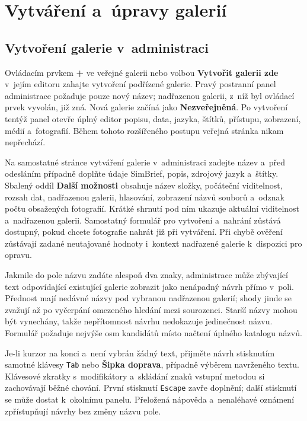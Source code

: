 \documentclass[11pt,a4paper]{article}
\newcommand{\ui}[1]{\textbf{#1}}
\newcommand{\codeword}[1]{\nolinkurl{#1}}
\begin{document}
\section{Vytváření a~úpravy galerií}
\label{sec:create-edit-gallery}

\subsection{Vytvoření galerie v~administraci}

Ovládacím prvkem \ui{+} ve veřejné galerii nebo volbou \ui{Vytvořit galerii zde}
v~jejím editoru zahajte vytvoření podřízené galerie. Pravý postranní panel
administrace požaduje pouze nový název; nadřazenou galerii, z~níž byl ovládací
prvek vyvolán, již zná. Nová galerie začíná jako \ui{Nezveřejněná}. Po vytvoření
tentýž panel otevře úplný editor popisu, data, jazyka, štítků, přístupu,
zobrazení, médií a~fotografií. Během tohoto rozšířeného postupu veřejná stránka
nikam nepřechází.

Na samostatné stránce vytváření galerie v~administraci zadejte název a~před
odesláním případně doplňte údaje SimBrief, popis, zdrojový jazyk a~štítky.
Sbalený oddíl \ui{Další možnosti} obsahuje název složky, počáteční viditelnost,
rozsah dat, nadřazenou galerii, hlasování, zobrazení názvů souborů a~odznak
počtu obsažených fotografií. Krátké shrnutí pod ním ukazuje aktuální viditelnost
a~nadřazenou galerii. Samostatný formulář pro vytvoření a~nahrání zůstává
dostupný, pokud chcete fotografie nahrát již při vytváření. Při chybě ověření
zůstávají zadané neutajované hodnoty i~kontext nadřazené galerie k~dispozici pro
opravu.

Jakmile do pole názvu zadáte alespoň dva znaky, administrace může zbývající text
odpovídající existující galerie zobrazit jako nenápadný návrh přímo v~poli.
Přednost mají nedávné názvy pod vybranou nadřazenou galerií; shody jinde se
zvažují až po vyčerpání omezeného hledání mezi sourozenci. Starší názvy mohou
být vynechány, takže nepřítomnost návrhu nedokazuje jedinečnost názvu. Formulář
požaduje nejvýše osm kandidátů místo načtení úplného katalogu názvů.

Je-li kurzor na konci a~není vybrán žádný text, přijměte návrh stisknutím
samotné klávesy \codeword{Tab} nebo \ui{Šipka doprava}, případně výběrem
navrženého textu. Klávesové zkratky s~modifikátory a~skládání znaků vstupní
metodou si zachovávají běžné chování. První stisknutí \codeword{Escape} zavře
doplnění; další stisknutí se může dostat k~okolnímu panelu. Přeložená nápověda
a~nenaléhavé oznámení zpřístupňují návrhy bez změny názvu pole.
\end{document}

